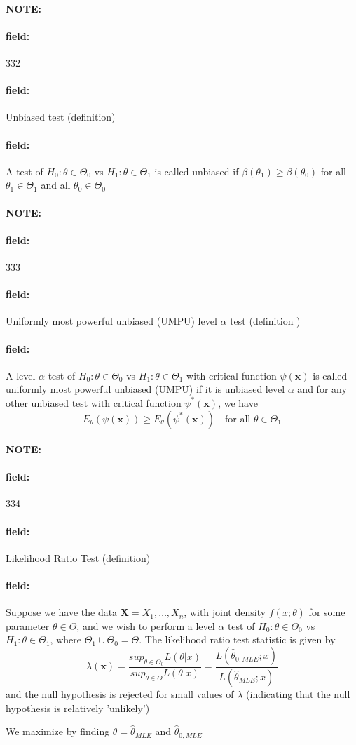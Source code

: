 \documentclass[12pt]{article}
\newenvironment{note}{\paragraph{NOTE:}}{}
\newenvironment{field}{\paragraph{field:}}{}
\begin{document}
\begin{note}
    \begin{field}
        \tiny 332
    \end{field}
    \begin{field}
        Unbiased test (definition)
    \end{field}
    \begin{field}
        A test of $H_0: \theta \in \Theta_0$ vs $H_1: \theta \in \Theta_1$ is called unbiased if $\beta(\theta_1) \geq \beta(\theta_0)$ for all $\theta_1 \in \Theta_1$ and  all $\theta_0 \in \Theta_0$
    \end{field}
\end{note}

\begin{note}
    \begin{field}
        \tiny 333
    \end{field}
    \begin{field}
        Uniformly most powerful unbiased (UMPU) level $\alpha$ test (definition )
    \end{field}
    \begin{field}
        A level $\alpha$ test of $H_0: \theta \in \Theta_0$ vs $H_1: \theta \in \Theta_1$ with critical function $\psi(\mathbf{x})$ is called uniformly most powerful unbiased (UMPU) if it is unbiased level $\alpha$ and for any other unbiased test with critical function $\psi^*(\mathbf{x})$, we have $$ E_\theta(\psi(\mathbf{x})) \geq E_\theta(\psi^*(\mathbf{x})) \quad \text{for all } \theta \in \Theta_1$$
    \end{field}
\end{note}


\begin{note}
    \begin{field}
        \tiny 334
    \end{field}
    \begin{field}
        Likelihood Ratio Test (definition)
    \end{field}
    \begin{field}
        Suppose we have the data $\mathbf{X} = X_1, \ldots , X_n$, with joint density $f(x;\theta)$ for some parameter $\theta \in \Theta$, and we wish to perform a level $\alpha$ test of $H_0: \theta \in \Theta_0$ vs $H_1: \theta \in \Theta_1$, where $\Theta_1 \cup \Theta_0 = \Theta$. The likelihood ratio test statistic is given by $$\lambda(\mathbf{x}) = \frac{sup_{\theta\in \Theta_0}L(\theta|x)}{sup_{\theta\in \Theta}L(\theta|x)} = \frac{L(\hat{\theta}_{0,MLE};x)}{L(\hat{\theta}_{MLE};x)}$$
        and the null hypothesis is rejected for small values of $\lambda$ (indicating that the null hypothesis is relatively 'unlikely')

        We maximize by finding $\theta = \hat{\theta}_{MLE}$ and $\hat{\theta}_{0,MLE}$


    \end{field}
\end{note}
\end{document}
